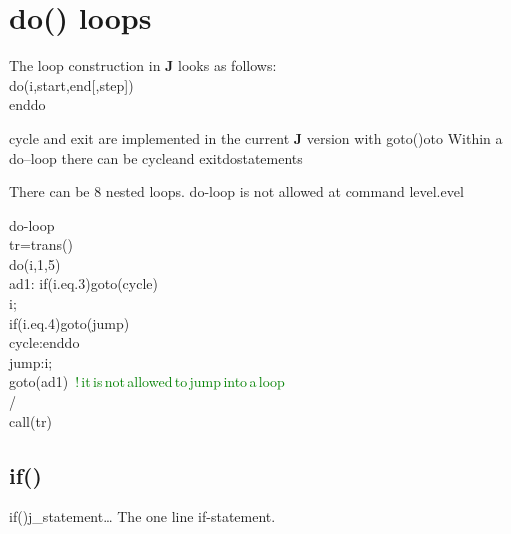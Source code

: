 \section{\textcolor{VioletRed}{do}() loops}
\label{loops}
The loop construction in \textbf{J} looks as follows:
\\
\textcolor{VioletRed}{do}(i,start,end[,step])
\\
enddo
\\
\begin{note}
cycle and exit are implemented in the current \textbf{J} version with \textcolor{VioletRed}{goto}()oto
Within a do–loop there can be cycleand exitdostatements
\end{note}
\begin{note}
There can be 8 nested loops. do-loop is not allowed at command level.evel
\end{note}
\begin{example}[doex]do-loop\\
\label{doex}
tr=\textcolor{VioletRed}{trans}()\\
\textcolor{VioletRed}{do}(i,1,5)\\
ad1: \textcolor{VioletRed}{if}(i.eq.3)\textcolor{VioletRed}{goto}(cycle)\\
i;\\
\textcolor{VioletRed}{if}(i.eq.4)\textcolor{VioletRed}{goto}(jump)\\
cycle:enddo\\
jump:i;\\
\textcolor{VioletRed}{goto}(ad1) \,\textcolor{green}{!\,it\,is\,not\,allowed\,to\,jump\,into\,a\,loop}\\
/\\
\textcolor{VioletRed}{call}(tr)
\end{example}
\subsection{\textcolor{VioletRed}{if}()}
\label{if}
\textcolor{VioletRed}{if}()j\_statement… \newline
The one line if-statement.
